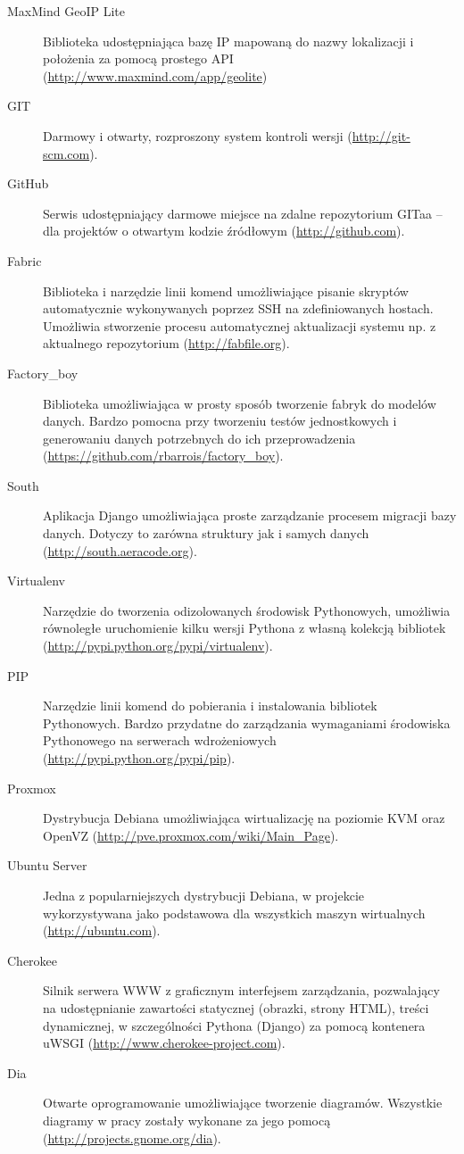 \begin{description}
    \item[MaxMind GeoIP Lite] Biblioteka udostępniająca bazę IP mapowaną do nazwy lokalizacji i położenia za pomocą prostego API (\url{http://www.maxmind.com/app/geolite})
    \item[GIT] Darmowy i otwarty, rozproszony system kontroli wersji (\url{http://git-scm.com}).
    \item[GitHub] Serwis udostępniający darmowe miejsce na zdalne repozytorium GITaa -- dla projektów o otwartym kodzie źródłowym (\url{http://github.com}).
    \item[Fabric] Biblioteka i narzędzie linii komend umożliwiające pisanie skryptów automatycznie wykonywanych poprzez SSH na zdefiniowanych hostach. Umożliwia stworzenie procesu automatycznej aktualizacji systemu np. z aktualnego repozytorium (\url{http://fabfile.org}).
    \item[Factory\_boy] Biblioteka umożliwiająca w prosty sposób tworzenie fabryk do modelów danych. Bardzo pomocna przy tworzeniu testów jednostkowych i generowaniu danych potrzebnych do ich przeprowadzenia (\url{https://github.com/rbarrois/factory\_boy}).
    \item[South] Aplikacja Django umożliwiająca proste zarządzanie procesem migracji bazy danych. Dotyczy to zarówna struktury jak i samych danych (\url{http://south.aeracode.org}).
    \item[Virtualenv] Narzędzie do tworzenia odizolowanych środowisk Pythonowych, umożliwia równoległe uruchomienie kilku wersji Pythona z własną kolekcją bibliotek (\url{http://pypi.python.org/pypi/virtualenv}).
    \item[PIP] Narzędzie linii komend do pobierania i instalowania bibliotek Pythonowych. Bardzo przydatne do zarządzania wymaganiami środowiska Pythonowego na serwerach wdrożeniowych (\url{http://pypi.python.org/pypi/pip}).
    \item[Proxmox] Dystrybucja Debiana umożliwiająca wirtualizację na poziomie KVM oraz OpenVZ (\url{http://pve.proxmox.com/wiki/Main_Page}).
    \item[Ubuntu Server] Jedna z popularniejszych dystrybucji Debiana, w projekcie wykorzystywana jako podstawowa dla wszystkich maszyn wirtualnych (\url{http://ubuntu.com}).
    \item[Cherokee] Silnik serwera WWW z graficznym interfejsem zarządzania, pozwalający na udostępnianie zawartości statycznej (obrazki, strony HTML), treści dynamicznej, w szczególności Pythona (Django) za pomocą kontenera uWSGI (\url{http://www.cherokee-project.com}).
    \item[Dia] Otwarte oprogramowanie umożliwiające tworzenie diagramów. Wszystkie diagramy w pracy zostały wykonane za jego pomocą (\url{http://projects.gnome.org/dia}).
\end{description}

\newpage
